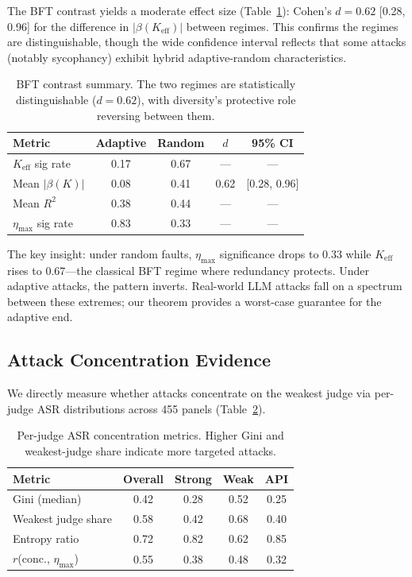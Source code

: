 \documentclass[11pt,a4paper]{article}
\begin{document}
The BFT contrast yields a moderate effect size (Table~\ref{tab:bft-summary}): Cohen's $d = 0.62$ [0.28, 0.96] for the difference in $|\beta(K_{\text{eff}})|$ between regimes. This confirms the regimes are distinguishable, though the wide confidence interval reflects that some attacks (notably sycophancy) exhibit hybrid adaptive-random characteristics.

\begin{table}[t]
\centering
\small
\caption{BFT contrast summary. The two regimes are statistically distinguishable ($d = 0.62$), with diversity's protective role reversing between them.}
\label{tab:bft-summary}
\begin{tabular}{@{}lcccc@{}}
\toprule
Metric & Adaptive & Random & $d$ & 95\% CI \\
\midrule
$K_{\text{eff}}$ sig rate   & 0.17 & 0.67 & --- & --- \\
Mean $|\beta(K)|$           & 0.08 & 0.41 & 0.62 & [0.28, 0.96] \\
Mean $R^2$                  & 0.38 & 0.44 & --- & --- \\
$\eta_{\max}$ sig rate      & 0.83 & 0.33 & --- & --- \\
\bottomrule
\end{tabular}
\vspace{-2mm}
\end{table}

The key insight: under random faults, $\eta_{\max}$ significance drops to 0.33 while $K_{\text{eff}}$ rises to 0.67---the classical BFT regime where redundancy protects. Under adaptive attacks, the pattern inverts. Real-world LLM attacks fall on a spectrum between these extremes; our theorem provides a worst-case guarantee for the adaptive end.

\subsection{Attack Concentration Evidence}

We directly measure whether attacks concentrate on the weakest judge via per-judge ASR distributions across 455 panels (Table~\ref{tab:concentration}).

\begin{table}[t]
\centering
\small
\caption{Per-judge ASR concentration metrics. Higher Gini and weakest-judge share indicate more targeted attacks.}
\label{tab:concentration}
\begin{tabular}{@{}lcccc@{}}
\toprule
Metric & Overall & Strong & Weak & API \\
\midrule
Gini (median)        & 0.42 & 0.28 & 0.52 & 0.25 \\
Weakest judge share  & 0.58 & 0.42 & 0.68 & 0.40 \\
Entropy ratio        & 0.72 & 0.82 & 0.62 & 0.85 \\
$r$(conc., $\eta_{\max}$) & 0.55 & 0.38 & 0.48 & 0.32 \\
\bottomrule
\end{tabular}
\vspace{-2mm}
\end{table}
\end{document}
